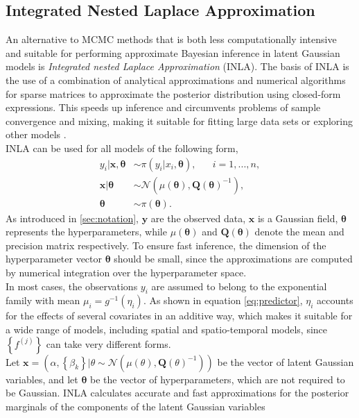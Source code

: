 \subsection{Integrated Nested Laplace Approximation}
An alternative to MCMC methods that is both less computationally intensive and suitable for performing approximate Bayesian inference in latent Gaussian models is \textit{Integrated nested Laplace Approximation} (INLA). The basis of INLA is the use of a combination of analytical approximations and numerical algorithms for sparse matrices to approximate the posterior distribution using closed-form expressions. This speeds up inference and circumvents problems of sample convergence and mixing, making it suitable for fitting large data sets or exploring other models \autocite[][]{rue2009approximate}.  \\
INLA can be used for all models of the following form,
\begin{align*}
    y_i|\pmb{x},\pmb{\theta} &\sim \pi\left(y_i|x_i,\pmb{\theta}\right), \hspace{20pt} i=1,...,n,\\
    \pmb{x}|\pmb{\theta} &\sim \mathcal{N}\left(\mu\left(\pmb{\theta}\right), \pmb{Q}\left(\pmb{\theta}\right)^{-1}\right), \\
    \pmb{\theta} &\sim \pi\left(\pmb{\theta}\right).
\end{align*}
As introduced in \autoref{sec:notation}, $\pmb{y}$ are the observed data, $\pmb{x}$ is a Gaussian field, $\pmb{\theta}$ represents the hyperparameters, while $\mu\left(\pmb{\theta}\right)$ and $\pmb{Q}\left(\pmb{\theta}\right)$ denote the mean and precision matrix respectively. To ensure fast inference, the dimension of the hyperparameter vector $\pmb{\theta}$ should be small, since the approximations are computed by numerical integration over the hyperparameter space. \\
In most cases, the observations $y_i$ are assumed to belong to the exponential family with mean $\mu_i=g^{-1}\left(\eta_i\right)$. As shown in equation \eqref{eq:predictor}, $\eta_i$ accounts for the effects of several covariates in an additive way, which makes it suitable for a wide range of models, including spatial and spatio-temporal models, since $\left\lbrace f^{(j)}\right\rbrace$ can take very different forms. \\
Let $\pmb{x}=\left(\alpha,\left\lbrace\beta_k\right\rbrace|\theta\sim\mathcal{N}\left(\mu\left(\theta\right), \pmb{Q}\left(\theta\right)^{-1}\right)\right)$ be the vector of latent Gaussian variables, and let $\pmb{\theta}$ be the vector of hyperparameters, which are not required to be Gaussian. INLA calculates accurate and fast approximations for the posterior marginals of the components of the latent Gaussian variables
